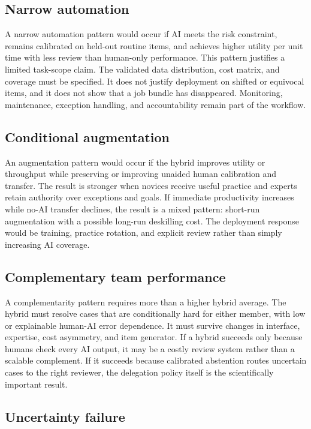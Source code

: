 \documentclass[conference]{IEEEtran}
\begin{document}
\subsection{Narrow automation}

A narrow automation pattern would occur if AI meets the risk constraint, remains calibrated on held-out routine items, and achieves higher utility per unit time with less review than human-only performance. This pattern justifies a limited task-scope claim. The validated data distribution, cost matrix, and coverage must be specified. It does not justify deployment on shifted or equivocal items, and it does not show that a job bundle has disappeared. Monitoring, maintenance, exception handling, and accountability remain part of the workflow.

\subsection{Conditional augmentation}

An augmentation pattern would occur if the hybrid improves utility or throughput while preserving or improving unaided human calibration and transfer. The result is stronger when novices receive useful practice and experts retain authority over exceptions and goals. If immediate productivity increases while no-AI transfer declines, the result is a mixed pattern: short-run augmentation with a possible long-run deskilling cost. The deployment response would be training, practice rotation, and explicit review rather than simply increasing AI coverage.

\subsection{Complementary team performance}

A complementarity pattern requires more than a higher hybrid average. The hybrid must resolve cases that are conditionally hard for either member, with low or explainable human-AI error dependence. It must survive changes in interface, expertise, cost asymmetry, and item generator. If a hybrid succeeds only because humans check every AI output, it may be a costly review system rather than a scalable complement. If it succeeds because calibrated abstention routes uncertain cases to the right reviewer, the delegation policy itself is the scientifically important result.

\subsection{Uncertainty failure}
\end{document}
